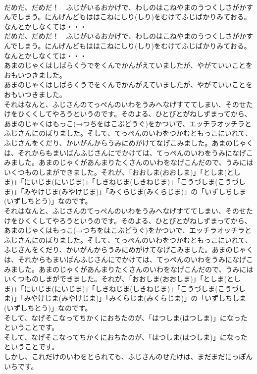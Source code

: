 \documentclass[8pt]{extreport}
\begin{document}
\begin{CJK}{UTF8}{min}
\\	だめだ、だめだ！　ふじがいるおかげで、わしのはこねやまのうつくしさがかすんでしまう。にんげんどもははこねにしり(しり)をむけてふじばかりみておる。なんとかしなくては・・・
\\	だめだ、だめだ！　ふじがいるおかげで、わしのはこねやまのうつくしさがかすんでしまう。にんげんどもははこねにしり(しり)をむけてふじばかりみておる。なんとかしなくては・・・
\\	あまのじゃくはしばらくうでをくんでかんがえていましたが、やがていいことをおもいつきました。
\\	あまのじゃくはしばらくうでをくんでかんがえていましたが、やがていいことをおもいつきました。
\\	それはなんと、ふじさんのてっぺんのいわをうみへなげすててしまい、そのせたけをひくくしてやろうというのです。そのよる、ひとびとがねしずまってから、あまのじゃくはもっこ(→つちをはこぶどうぐ)をかついで、エッチラオッチラとふじさんにのぼりました。そして、てっぺんのいわをつかむともっこにいれて、ふじさんをくだり、かいがんからうみにめがけてなげこみました。あまのじゃくは、それからもまいばんふじさんにでかけては、てっぺんのいわをうみになげこみました。あまのじゃくがあんまりたくさんのいわをなげこんだので、うみにはいくつものしまができました。それが、「おおしま(おおしま)」「としま(としま)」「にいじま(にいじま)」「しきねじま(しきねじま)」「こうづしま(こうづしま)」「みやけじま(みやけじま)」「みくらじま(みくらじま)」の「いずしちしま(いずしちとう)」なのです。
\\	それはなんと、ふじさんのてっぺんのいわをうみへなげすててしまい、そのせたけをひくくしてやろうというのです。そのよる、ひとびとがねしずまってから、あまのじゃくはもっこ(→つちをはこぶどうぐ)をかついで、エッチラオッチラとふじさんにのぼりました。そして、てっぺんのいわをつかむともっこにいれて、ふじさんをくだり、かいがんからうみにめがけてなげこみました。あまのじゃくは、それからもまいばんふじさんにでかけては、てっぺんのいわをうみになげこみました。あまのじゃくがあんまりたくさんのいわをなげこんだので、うみにはいくつものしまができました。それが、「おおしま(おおしま)」「としま(としま)」「にいじま(にいじま)」「しきねじま(しきねじま)」「こうづしま(こうづしま)」「みやけじま(みやけじま)」「みくらじま(みくらじま)」の「いずしちしま(いずしちとう)」なのです。
\\	そして、なげそこなってちかくにおちたのが、「はつしま(はつしま)」になったということです。
\\	そして、なげそこなってちかくにおちたのが、「はつしま(はつしま)」になったということです。
\\	しかし、これだけのいわをとられても、ふじさんのせたけは、まだまだにっぽんいちです。

\end{CJK}
\end{document}
